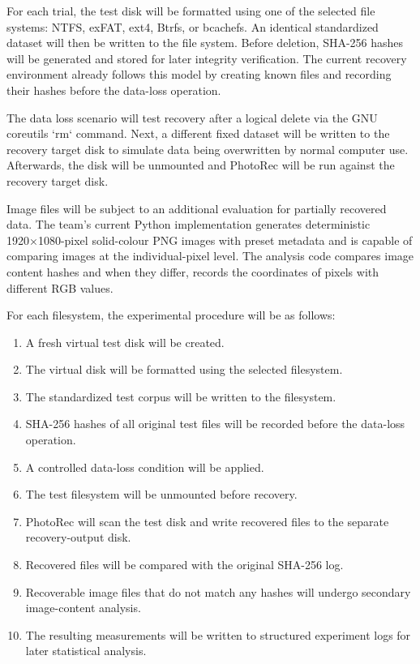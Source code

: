 \documentclass[conference]{IEEEtran}
\begin{document}
For each trial, the test disk will be formatted using one of the selected file systems: NTFS, exFAT, ext4, Btrfs, or bcachefs. An identical standardized dataset will then be written to the file system. Before deletion, SHA-256 hashes will be generated and stored for later integrity verification. The current recovery environment already follows this model by creating known files and recording their hashes before the data-loss operation.

The data loss scenario will test recovery after a logical delete via the GNU coreutils `rm` command. Next, a different fixed dataset will be written to the recovery target disk to simulate data being overwritten by normal computer use. Afterwards, the disk will be unmounted and PhotoRec will be run against the recovery target disk.

Image files will be subject to an additional evaluation for partially recovered data. The team's current Python implementation generates deterministic 1920×1080-pixel solid-colour PNG images with preset metadata and is capable of comparing images at the individual-pixel level. The analysis code compares image content hashes and when they differ, records the coordinates of pixels with different RGB values.

For each filesystem, the experimental procedure will be as follows:
\begin{enumerate}
    \item A fresh virtual test disk will be created.
    \item The virtual disk will be formatted using the selected filesystem.
    \item The standardized test corpus will be written to the filesystem.
    \item SHA-256 hashes of all original test files will be recorded before the data-loss operation.
    \item A controlled data-loss condition will be applied.
    \item The test filesystem will be unmounted before recovery.
    \item PhotoRec will scan the test disk and write recovered files to the separate recovery-output disk.
    \item Recovered files will be compared with the original SHA-256 log.
    \item Recoverable image files that do not match any hashes will undergo secondary image-content analysis.
    \item The resulting measurements will be written to structured experiment logs for later statistical analysis.
\end{enumerate}
\end{document}
